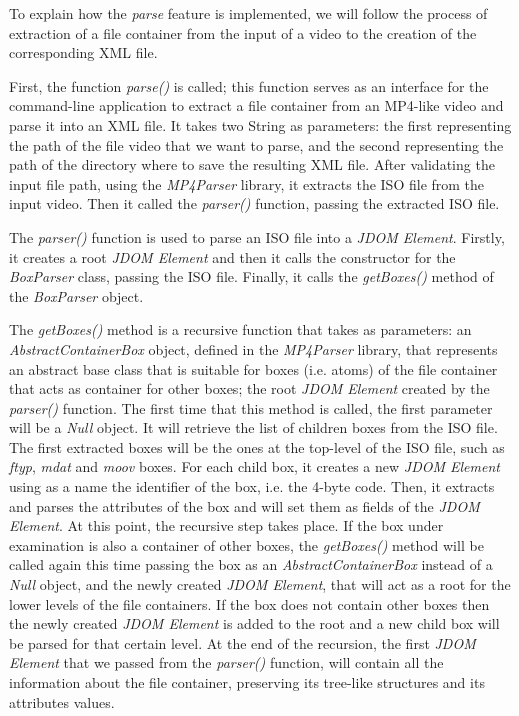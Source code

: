 To explain how the \emph{parse} feature is implemented, we will follow the process of extraction of a file container from the input of a video to the creation of the corresponding XML file.

First, the function \emph{parse()} is called; this function serves as an interface for the command-line application to extract a file container from an MP4-like video and parse it into an XML file. It takes two String as parameters: the first representing the path of the file video that we want to parse, and the second representing the path of the directory where to save the resulting XML file. After validating the input file path, using the \emph{MP4Parser} library, it extracts the ISO file from the input video. Then it called the \emph{parser()} function, passing the extracted ISO file.

The \emph{parser()} function is used to parse an ISO file into a \emph{JDOM Element}. Firstly, it creates a root \emph{JDOM Element} and then it calls the constructor for the \emph{BoxParser} class, passing the ISO file. Finally, it calls the \emph{getBoxes()} method of the \emph{BoxParser} object.

The \emph{getBoxes()} method is a recursive function that takes as parameters: an \emph{AbstractContainerBox} object, defined in the \emph{MP4Parser} library, that represents an abstract base class that is suitable for boxes (i.e. atoms) of the file container that acts as container for other boxes; the root \emph{JDOM Element} created by the \emph{parser()} function.
The first time that this method is called, the first parameter will be a \emph{Null} object. It will retrieve the list of children boxes from the ISO file. The first extracted boxes will be the ones at the top-level of the ISO file, such as \emph{ftyp}, \emph{mdat} and \emph{moov} boxes.
For each child box, it creates a new \emph{JDOM Element} using as a name the identifier of the box, i.e. the 4-byte code. Then, it extracts and parses the attributes of the box and will set them as fields of the \emph{JDOM Element}. At this point, the recursive step takes place. If the box under examination is also a container of other boxes, the \emph{getBoxes()} method will be called again this time passing the box as an \emph{AbstractContainerBox} instead of a \emph{Null} object, and the newly created \emph{JDOM Element}, that will act as a root for the lower levels of the file containers. If the box does not contain other boxes then the newly created \emph{JDOM Element} is added to the root and a new child box will be parsed for that certain level.
At the end of the recursion, the first \emph{JDOM Element} that we passed from the \emph{parser()} function, will contain all the information about the file container, preserving its tree-like structures and its attributes values.

